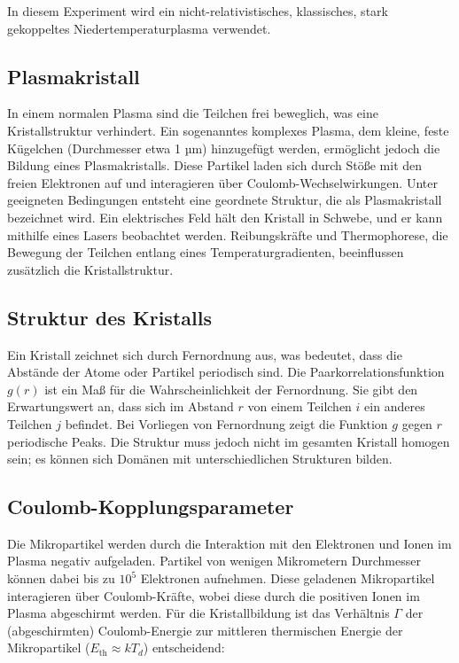 \documentclass[12pt,a4paper,ngerman]{article}
\begin{document}
In diesem Experiment wird ein nicht-relativistisches, klassisches, stark gekoppeltes Niedertemperaturplasma verwendet.

\subsection{Plasmakristall}
In einem normalen Plasma sind die Teilchen frei beweglich, was eine Kristallstruktur verhindert. Ein sogenanntes komplexes Plasma, dem kleine, feste Kügelchen (Durchmesser etwa 1 µm) hinzugefügt werden, ermöglicht jedoch die Bildung eines Plasmakristalls. Diese Partikel laden sich durch Stöße mit den freien Elektronen auf und interagieren über Coulomb-Wechselwirkungen. Unter geeigneten Bedingungen entsteht eine geordnete Struktur, die als Plasmakristall bezeichnet wird. Ein elektrisches Feld hält den Kristall in Schwebe, und er kann mithilfe eines Lasers beobachtet werden. Reibungskräfte und Thermophorese, die Bewegung der Teilchen entlang eines Temperaturgradienten, beeinflussen zusätzlich die Kristallstruktur.

\subsection{Struktur des Kristalls}
Ein Kristall zeichnet sich durch Fernordnung aus, was bedeutet, dass die Abstände der Atome oder Partikel periodisch sind. Die Paarkorrelationsfunktion \( g(r) \) ist ein Maß für die Wahrscheinlichkeit der Fernordnung. Sie gibt den Erwartungswert an, dass sich im Abstand \( r \) von einem Teilchen \( i \) ein anderes Teilchen \( j \) befindet. Bei Vorliegen von Fernordnung zeigt die Funktion \( g \) gegen \( r \) periodische Peaks. Die Struktur muss jedoch nicht im gesamten Kristall homogen sein; es können sich Domänen mit unterschiedlichen Strukturen bilden.

\subsection{Coulomb-Kopplungsparameter}
Die Mikropartikel werden durch die Interaktion mit den Elektronen und Ionen im Plasma negativ aufgeladen. Partikel von wenigen Mikrometern Durchmesser können dabei bis zu \(10^5\) Elektronen aufnehmen. Diese geladenen Mikropartikel interagieren über Coulomb-Kräfte, wobei diese durch die positiven Ionen im Plasma abgeschirmt werden. Für die Kristallbildung ist das Verhältnis \( \Gamma \) der (abgeschirmten) Coulomb-Energie zur mittleren thermischen Energie der Mikropartikel (\(E_{\text{th}} \approx kT_d\)) entscheidend:
\end{document}
